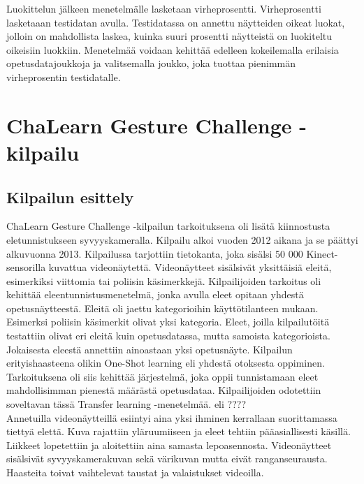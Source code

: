 Luokittelun jälkeen menetelmälle lasketaan virheprosentti. Virheprosentti lasketaaan testidatan avulla.
Testidatassa on annettu näytteiden oikeat luokat, jolloin on mahdollista laskea, kuinka suuri prosentti
näytteistä on luokiteltu oikeisiin luokkiin. Menetelmää voidaan kehittää edelleen kokeilemalla erilaisia
opetusdatajoukkoja ja valitsemalla joukko, joka tuottaa pienimmän virheprosentin testidatalle. 

\section{ChaLearn Gesture Challenge -kilpailu}
\label{ChaLearn Gesture Challenge -kilpailu}

\subsection{Kilpailun esittely}
ChaLearn Gesture Challenge -kilpailun tarkoituksena oli lisätä kiinnostusta eletunnistukseen syvyyskameralla.
Kilpailu alkoi vuoden 2012 aikana ja se päättyi alkuvuonna 2013.
Kilpailussa tarjottiin tietokanta, joka sisälsi 50 000 Kinect-sensorilla kuvattua videonäytettä. Videonäytteet sisälsivät yksittäisiä
eleitä, esimerkiksi viittomia tai poliisin käsimerkkejä. Kilpailijoiden tarkoitus oli kehittää eleentunnistusmenetelmä, jonka avulla eleet
opitaan yhdestä opetusnäytteestä. Eleitä oli jaettu kategorioihin käyttötilanteen mukaan. Esimerksi poliisin käsimerkit olivat yksi kategoria. 
Eleet, joilla kilpailutöitä testattiin olivat eri eleitä kuin opetusdatassa, mutta samoista kategorioista.\\

Jokaisesta eleestä annettiin ainoastaan yksi opetusnäyte. Kilpailun erityishaasteena olikin One-Shot learning eli yhdestä otoksesta oppiminen. Tarkoituksena oli siis kehittää järjestelmä, joka oppii
tunnistamaan eleet mahdollisimman pienestä määrästä opetusdataa. Kilpailijoiden odotettiin soveltavan
tässä Transfer learning -menetelmää. eli ????\\

Annetuilla videonäytteillä esiintyi aina yksi ihminen kerrallaan suorittamassa tiettyä elettä. Kuva rajattiin yläruumiiseen ja eleet tehtiin
pääasiallisesti käsillä. Liikkeet lopetettiin ja aloitettiin aina samasta lepoasennosta. Videonäytteet sisälsivät syvyyskamerakuvan sekä värikuvan 
mutta eivät ranganseurausta. Haasteita toivat vaihtelevat taustat ja valaistukset videoilla. \\

